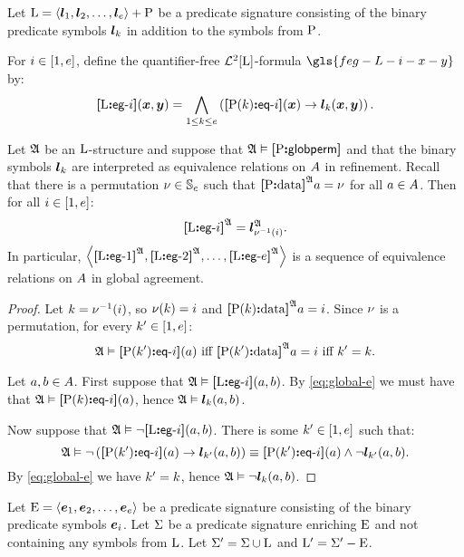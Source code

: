 Let ${\mathrm{L}} = \left\langle \bm{l}_{1}, \bm{l}_{2}, \dots, \bm{l}_{e} \right\rangle + {\mathrm{P}}$ be a predicate
signature consisting of the binary predicate symbols $\bm{l}_{k}$ in addition to
the symbols from ${\mathrm{P}}$.

\begin{definition}
For $i \in [1, e]$, define the quantifier-free $\mathcal{L}^{2}[{\mathrm{L}}]$-formula
$\gls{feg-L-i-x-y}$ by:
\[
  {\bm{[}{\mathrm{L}}\mathord{\bm{:}}\mathsf{eg}{\hbox{-}}i\bm{]}}(\bm{x},\bm{y}) = \bigwedge_{1 \leq k \leq e}
  \left({\bm{[}{\mathrm{P}}(k)\mathord{\bm{:}}\mathsf{eq}{\hbox{-}}i\bm{]}}(\bm{x}) \rightarrow \bm{l}_{k}(\bm{x}, \bm{y})\right).
\]
\end{definition}
\begin{remark}\label{rem:global-e-m}
Let $\mathfrak{A}$ be an ${\mathrm{L}}$-structure and suppose that 
$\mathfrak{A} \vDash {\bm{[}{\mathrm{P}}\mathord{\bm{:}}\mathsf{globperm}\bm{]}}$
and that the binary symbols $\bm{l}_{k}$ are interpreted as equivalence relations
on $A$ in refinement.
Recall that there is a permutation $\nu \in \mathbb{S}_{e}$ such that
${\bm{[}{\mathrm{P}}\mathord{\bm{:}}\mathrm{data}\bm{]}}^{\mathfrak{A}}a =\nu$ for all $a \in A$.
Then for all $i \in [1, e]$:
\[
  {\bm{[}{\mathrm{L}}\mathord{\bm{:}}\mathsf{eg}{\hbox{-}}i\bm{]}}^{\mathfrak{A}} = \bm{l}_{\nu^{-1}(i)}^{\mathfrak{A}}.
\]
In particular,
$\left\langle {\bm{[}{\mathrm{L}}\mathord{\bm{:}}\mathsf{eg}{\hbox{-}}1\bm{]}}^{\mathfrak{A}}, {\bm{[}{\mathrm{L}}\mathord{\bm{:}}\mathsf{eg}{\hbox{-}}2\bm{]}}^{\mathfrak{A}}, \dots, {\bm{[}{\mathrm{L}}\mathord{\bm{:}}\mathsf{eg}{\hbox{-}}e\bm{]}}^{\mathfrak{A}} \right\rangle$ is
a sequence of equivalence relations on $A$ in global agreement.
\end{remark}
\begin{proof}
Let $k = \nu^{-1}(i)$, so $\nu(k) = i$ and
${\bm{[}{\mathrm{P}}(k)\mathord{\bm{:}}\mathrm{data}\bm{]}}^{\mathfrak{A}}a = i$.
Since $\nu$ is a permutation, for every ${k'} \in [1, e]$:
\begin{equation}\label{eq:global-e}
\mifff{
  \StrA \vDash \feqA{\PS(\kkp)}\ii(\ea)}{
  \data{\PSp\kkp}\StrA\ea = \ii}{
  \kkp = \kk}.
\end{equation}

Let $a, b \in A$.
First suppose that $\mathfrak{A} \vDash {\bm{[}{\mathrm{L}}\mathord{\bm{:}}\mathsf{eg}{\hbox{-}}i\bm{]}}(a,b)$.
By \cref{eq:global-e} we must have that ${\mathfrak{A} \vDash
{\bm{[}{\mathrm{P}}(k)\mathord{\bm{:}}\mathsf{eq}{\hbox{-}}i\bm{]}}(a)}$, hence $\mathfrak{A} \vDash \bm{l}_{k}(a,b)$.

Now suppose that $\mathfrak{A} \vDash \lnot{\bm{[}{\mathrm{L}}\mathord{\bm{:}}\mathsf{eg}{\hbox{-}}i\bm{]}}(a,b)$. There is some
${k'} \in [1, e]$ such that:
\[
  \mathfrak{A} \vDash \lnot\left({\bm{[}{\mathrm{P}}({k'})\mathord{\bm{:}}\mathsf{eq}{\hbox{-}}i\bm{]}}(a) \rightarrow
  \bm{l}_{{k'}}(a,b)\right) \equiv {\bm{[}{\mathrm{P}}({k'})\mathord{\bm{:}}\mathsf{eq}{\hbox{-}}i\bm{]}}(a) \land
  \lnot\bm{l}_{{k'}}(a,b).
\]
By \cref{eq:global-e} we have ${k'} = k$, hence
$\mathfrak{A} \vDash \lnot\bm{l}_{k}(a,b)$.
\end{proof}

Let ${\mathrm{E}} = \left\langle \bm{e}_{1},\bm{e}_{2},\dots,\bm{e}_{e} \right\rangle$ be a predicate signature consisting
of the binary predicate symbols $\bm{e}_{i}$.
Let $\mathrm{\Sigma}$ be a predicate signature enriching ${\mathrm{E}}$ and not
containing any symbols from ${\mathrm{L}}$.
Let $\mathrm{\Sigma'} = \mathrm{\Sigma} \cup {\mathrm{L}}$ and
${{\mathrm{L}}'} = \mathrm{\Sigma'} - {\mathrm{E}}$.

